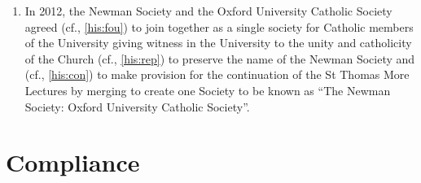 \documentclass[11pt]{article}
\begin{document}
\begin{enumerate}
\begin{enumerate}
\item \label{his:join} In 2012, the Newman Society and the Oxford University Catholic Society agreed (cf., \cref{his:fou}) to join together as a single society for Catholic members of the University giving witness in the University to the unity and catholicity of the Church (cf., \cref{his:rep}) to preserve the name of the Newman Society and (cf., \cref{his:con}) to make provision for the continuation of the St Thomas More Lectures by merging to create one Society to be known as ``The Newman Society: Oxford University Catholic Society''.
\end{enumerate}
\end{enumerate}
\section{Compliance}\label{con:com}
\end{document}
